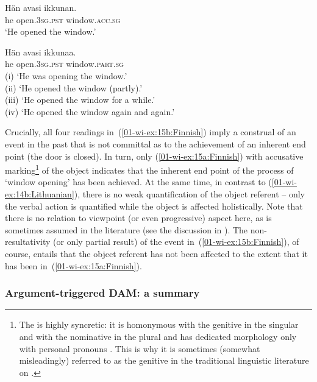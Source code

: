 \documentclass[output=paper]{LSP/langsci}
\begin{document}
\ea\label{01-wi-ex:15:Finnish}
\begin{xlist}

\ex\label{01-wi-ex:15a:Finnish}
	\gll Hän	avasi		ikkunan.\\
	he	open.\textsc{3sg.pst}	window.\textsc{acc.sg}\\
	\glt ‘He opened the window.’

\ex\label{01-wi-ex:15b:Finnish}
	\gll Hän	avasi		ikkunaa.\\
	he	open.\textsc{3sg.pst}	window.\textsc{part.sg}\\
	\glt 	(i) ‘He was opening the window.’\\
		(ii) ‘He opened the window (partly).’\\
		(iii) ‘He opened the window for a while.’\\
		(iv) ‘He opened the window again and again.’\\
\end{xlist}
\z

\noindent Crucially, all four readings in~(\ref{01-wi-ex:15b:Finnish}) imply a construal of an event in the past that is not committal as to the achievement of an inherent end point (the door is closed). 
In turn, only (\ref{01-wi-ex:15a:Finnish}) with accusative marking\footnote{The   is highly syncretic: it is homonymous with the genitive in the singular and with the nominative in the plural and has dedicated morphology only with personal pronouns \citep[100--101]{Karlsson1999Essential}.
 This is why it is sometimes (somewhat misleadingly) referred to as the genitive in the traditional linguistic literature on .} 
of the object indicates that the inherent end point of the process of ‘window opening’ has been achieved. 
At the same time, in contrast to (\ref{01-wi-ex:14b:Lithuanian}), there is no weak quantification of the object referent – only the verbal action is quantified while the object is affected holistically. 
Note that there is no relation to viewpoint (or even progressive) aspect here, as is sometimes assumed in the literature (see the discussion in \citealt{Serzant2015Independent}). 
The non-resultativity (or only partial result) of the event in~(\ref{01-wi-ex:15b:Finnish}), of course, entails that the object referent has not been affected to the extent that it has been in~(\ref{01-wi-ex:15a:Finnish}).

\subsubsection{Argument-triggered DAM: a summary}
\label{01-wi-sec:2.1.7-DAMsummary2}
\end{document}
